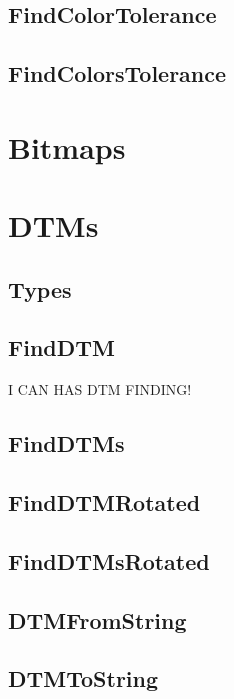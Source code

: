 \documentclass[a4paper]{report}
\begin{document}
\subsection{FindColorTolerance}

\subsection{FindColorsTolerance}

\section{Bitmaps}


\section{DTMs}

\subsection{Types}

\subsection{FindDTM}

I CAN HAS DTM FINDING!

\subsection{FindDTMs}

\subsection{FindDTMRotated}

\subsection{FindDTMsRotated}

\subsection{DTMFromString}

\subsection{DTMToString}
\end{document}
